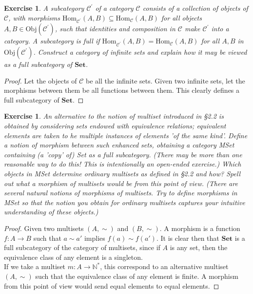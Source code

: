 \documentclass[a4paper, 11pt]{book}
\theoremstyle{plain}
\newtheorem{exercise}[theorem]{Exercise}
\theoremstyle{plain}
\begin{document}
\begin{exercise}
A subcategory $\mathcal{C}^\prime$ of a category $\mathcal{C}$ consists of a collection of objects of $\mathcal{C}$, with morphisms $\text{Hom}_{\mathcal{C}^\prime}(A,B)\subseteq \text{Hom}_\mathcal{C}(A,B)$ for all objects $A,B\in \text{Obj}(\mathcal{C}^\prime)$, such that identities and composition in $\mathcal{C}$ make $\mathcal{C}^\prime$ into a category. A subcategory is full if $\text{Hom}_{\mathcal{C}^\prime}(A,B)=\text{Hom}_\mathcal{C}(A,B)$ for all $A,B$ in $\text{Obj}(\mathcal{C}^\prime)$. Construct a category of infinite sets and explain how it may be viewed as a full subcategory of $\textbf{Set}$.
\end{exercise}
\begin{proof}
Let the objects of $\mathcal{C}$ be all the infinite sets. Given two infinite sets, let the morphisms between them be all functions between them. This clearly defines a full subcategory of $\textbf{Set}$.
\end{proof}

\begin{exercise}
An alternative to the notion of multiset introduced in \S 2.2 is obtained by considering sets endowed with equivalence relations; equivalent elements are taken
to he multiple instances of elements 'of the same kind'. Define a notion of morphism between such enhanced sets, obtaining a category MSet containing (a 'copy' of) Set
as a full subcategory. (There may be more than one reasonable way to do this! This is intentionally an open-ended exercise.) Which objects in MSet determine
ordinary multisets as defined in §2.2 and how? Spell out what a morphism of multisets would be from this point of view. (There are several natural notions
of morphisms of multisets. Try to define morphisms in MSet so that the notion you obtain for ordinary multisets captures your intuitive understanding of these
objects.)
\end{exercise}
\begin{proof}
Given two multisets $(A,\sim)$ and $(B,\sim)$. A morphism is a function $f:A\rightarrow B$ such that $a\sim a'$ implies $f(a)\sim f(a')$. It is clear then that $\mathbf{Set}$ is a full subcategory of the category of multisets, since if $A$ is any set, then the equivalence class of any element is a singleton.\\
If we take a multiset $m:A\rightarrow \mathbb{N}^*$, this correspond to an alternative multiset $(A,\sim)$ such that the equivalence class of any element is finite. A morphism from this point of view would send equal elements to equal elements.
\end{proof}
\end{document}
